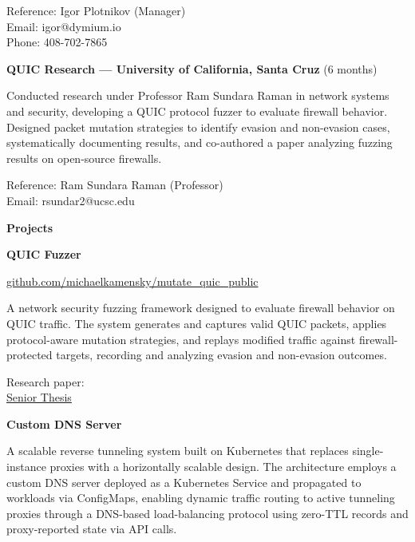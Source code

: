 \documentclass[11pt]{article}
\begin{document}
Reference: Igor Plotnikov (Manager) \\
Email: igor@dymium.io \\
Phone: 408-702-7865

\vspace{6pt}

\textbf{QUIC Research --- University of California, Santa Cruz} (6 months)

Conducted research under Professor Ram Sundara Raman in network systems and security, developing a QUIC protocol fuzzer to evaluate firewall behavior. Designed packet mutation strategies to identify evasion and non-evasion cases, systematically documenting results, and co-authored a paper analyzing fuzzing results on open-source firewalls.

Reference: Ram Sundara Raman (Professor) \\
Email: rsundar2@ucsc.edu

\vspace{10pt}

\textbf{\large Projects}

\vspace{6pt}

\textbf{QUIC Fuzzer}

\href{https://github.com/michaelkamensky/mutate_quic_public}{github.com/michaelkamensky/mutate\_quic\_public}

A network security fuzzing framework designed to evaluate firewall behavior on QUIC traffic. The system generates and captures valid QUIC packets, applies protocol-aware mutation strategies, and replays modified traffic against firewall-protected targets, recording and analyzing evasion and non-evasion outcomes.

Research paper: \\
\href{https://github.com/michaelkamensky/Fuzzing-Firewalls-with-QUIC/blob/main/cse195_senior_thesis.pdf}{Senior Thesis}

\vspace{6pt}

\textbf{Custom DNS Server}

A scalable reverse tunneling system built on Kubernetes that replaces single-instance proxies with a horizontally scalable design. The architecture employs a custom DNS server deployed as a Kubernetes Service and propagated to workloads via ConfigMaps, enabling dynamic traffic routing to active tunneling proxies through a DNS-based load-balancing protocol using zero-TTL records and proxy-reported state via API calls.
\end{document}
